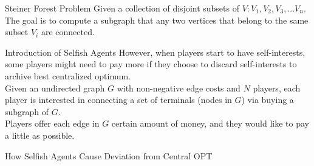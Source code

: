 \documentclass[11pt,aspectratio=169]{beamer}
\begin{document}
\begin{frame}{Steiner Forest Problem}
 Given a collection of disjoint subsets of \(V: V_1,V_2,V_3,...V_n\). The goal is to compute a subgraph that any two vertices that belong to the same subset \(V_i\) are connected.
\end{frame}

\begin{frame}{Introduction of Selfish Agents}
However, when players start to have self-interests, some players might need to pay more if they choose to discard self-interests to archive best centralized optimum. \\
\vspace{10pt}
Given an undirected graph \(G\) with non-negative edge costs and \(N\) players, each player is interested in connecting a set of terminals (nodes in \(G\)) via buying a subgraph of \(G\). \\
\vspace{10pt}
Players offer each edge in \(G\) certain amount of money, and they would like to pay a little as possible. 
\end{frame}

\begin{frame}{How Selfish Agents Cause Deviation from Central OPT}
    \begin{figure}
        \begin{center}
\hspace*{10pt}
\hspace*{10pt}
    
\end{center}
\end{figure}
\end{frame}
\end{document}
